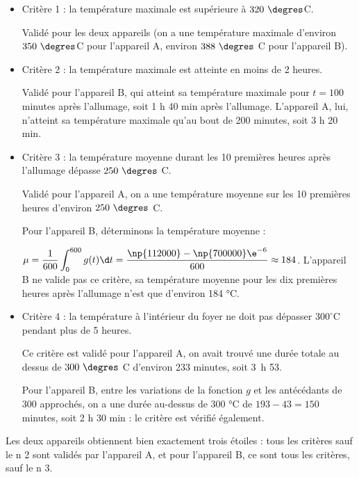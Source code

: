 \begin{itemize}
\item Critère 1 : la température maximale est supérieure à $320~\degres$C.

	Validé pour les deux appareils (on a une température maximale d'environ $350~\degres$C pour l'appareil A, environ $388~\degres$ C pour l'appareil B).

\item Critère 2 : la température maximale est atteinte en moins de 2 heures.

Validé pour l'appareil B, qui atteint sa température maximale pour $t = 100$ minutes après l'allumage, soit 1 h 40 min après l'allumage. L'appareil A, lui, n'atteint sa température maximale qu'au bout de 200 minutes, soit 3 h 20 min.
\item Critère 3 : la température moyenne durant les 10 premières heures après l'allumage dépasse $250~\degres$ C.

Validé pour l'appareil A, on a une température moyenne sur les 10 premières heures d'environ $250~\degres$ C.

Pour l'appareil B, déterminons la température moyenne :

$\mu = \dfrac{1}{600} \displaystyle \int_{0}^{600}g(t) \d t = \dfrac{\np{112000} - \np{700000}\e^{-6}}{600} \approx 184$. L'appareil B ne valide pas ce critère, sa température moyenne pour les dix premières heures après l'allumage n'est que d'environ 184 °C.

\item Critère 4 : la température à l'intérieur du foyer ne doit pas dépasser $300^{\circ} \mathrm{C}$ pendant plus de 5 heures.

Ce critère est validé pour l'appareil A, on avait trouvé une durée totale au dessus de $300~\degres$ C d'environ 233 minutes, soit 3~h 53.

Pour l'appareil B, entre les variations de la fonction $g$ et les antécédants de 300 approchés, on a une durée au-dessus de 300 °C de $193 - 43 = 150$ minutes, soit 2 h 30 min : le critère est vérifié également.
\end{itemize}

Les deux appareils obtiennent bien exactement trois étoiles : tous les critères sauf le n 2 sont validés par l'appareil A, et pour l'appareil B, ce sont tous les critères, sauf le n 3.
